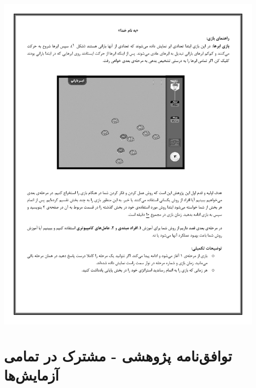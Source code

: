 \documentclass[twoside, a4paper,11pt]{book}
\numberwithin{equation}{chapter}
\numberwithin{table}{chapter}
\numberwithin{figure}{chapter}
\numberwithin{equation}{chapter}
\begin{document}
\begin{center}
\includegraphics[page=4,scale=0.8, center]{docs/InformationForm_V07.pdf}
\end{center}

\section{توافق‌نامه پژوهشی - مشترک در تمامی آزمایش‌ها}
\end{document}
